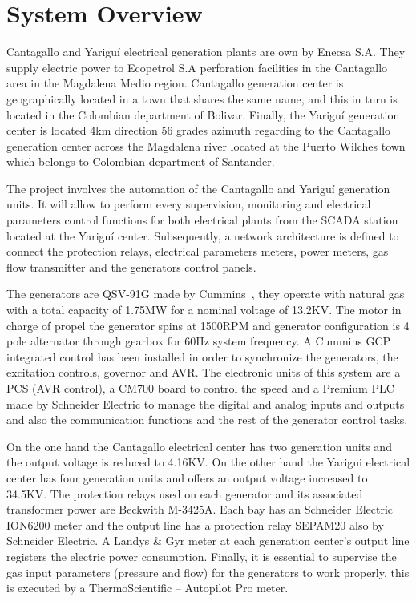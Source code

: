 
\section{System Overview}

Cantagallo and Yariguí electrical generation plants are own by Enecsa S.A.
They supply electric power to Ecopetrol S.A perforation facilities in the
Cantagallo area in the Magdalena Medio region. Cantagallo generation
center is geographically located in a town that shares the same name, and this
in turn is located in the Colombian department of Bolivar. Finally, the Yariguí
generation center is located 4km direction 56 grades azimuth regarding to
the Cantagallo generation center across the Magdalena river located at the
Puerto Wilches town which belongs to Colombian department of Santander.

The project involves the automation of the Cantagallo and Yariguí
generation units. It will allow to perform every supervision,
monitoring and electrical parameters control functions for both
electrical plants from the SCADA station located at the Yariguí
center. Subsequently, a network architecture is defined to connect the
protection relays, electrical parameters meters, power meters, gas
flow transmitter and the generators control panels.

The generators are QSV-91G made by Cummins~\cite{cummins:2005}, they operate 
with natural gas with a total capacity of 1.75MW for a nominal voltage
of 13.2KV. The motor in charge of propel the generator spins at 1500RPM and 
generator configuration is 4 pole alternator through gearbox for 60Hz
system frequency. A Cummins GCP integrated control has been installed 
in order to synchronize the generators, the excitation controls, governor 
and AVR. The electronic units of this system are a PCS (AVR control), a CM700
board to control the speed and a Premium PLC made by Schneider Electric
to manage the digital and analog inputs and outputs and also the
communication functions and the rest of the generator control tasks.

On the one hand the Cantagallo electrical center has two generation
units and the output voltage is reduced to 4.16KV. On the other hand
the Yarigui electrical center has four generation units and offers
an output voltage increased to 34.5KV. The protection relays used on
each generator and its associated transformer power are Beckwith
M-3425A. Each bay has an Schneider Electric ION6200 meter
and the output line has a protection relay SEPAM20 also by Schneider
Electric. A Landys \& Gyr meter at each generation center's output
line registers the electric power consumption. Finally, it is
essential to supervise the gas input parameters (pressure and flow)
for the generators to work properly, this is executed by a
ThermoScientific – Autopilot Pro meter.

